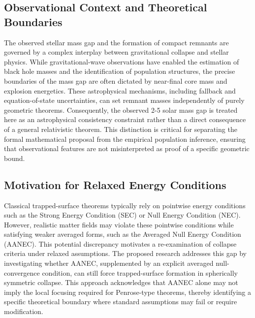 \documentclass[conference]{IEEEtran}
\begin{document}
\subsection{Observational Context and Theoretical Boundaries}
The observed stellar mass gap and the formation of compact remnants are governed by a complex interplay between gravitational collapse and stellar physics. While gravitational-wave observations have enabled the estimation of black hole masses and the identification of population structures, the precise boundaries of the mass gap are often dictated by near-final core mass and explosion energetics. These astrophysical mechanisms, including fallback and equation-of-state uncertainties, can set remnant masses independently of purely geometric theorems. Consequently, the observed 2-5 solar mass gap is treated here as an astrophysical consistency constraint rather than a direct consequence of a general relativistic theorem. This distinction is critical for separating the formal mathematical proposal from the empirical population inference, ensuring that observational features are not misinterpreted as proof of a specific geometric bound.~\cite{cite_d3016ce6d1faa8ec,cite_7a407c865faafd11}

\subsection{Motivation for Relaxed Energy Conditions}
Classical trapped-surface theorems typically rely on pointwise energy conditions such as the Strong Energy Condition (SEC) or Null Energy Condition (NEC). However, realistic matter fields may violate these pointwise conditions while satisfying weaker averaged forms, such as the Averaged Null Energy Condition (AANEC). This potential discrepancy motivates a re-examination of collapse criteria under relaxed assumptions. The proposed research addresses this gap by investigating whether AANEC, supplemented by an explicit averaged null-convergence condition, can still force trapped-surface formation in spherically symmetric collapse. This approach acknowledges that AANEC alone may not imply the local focusing required for Penrose-type theorems, thereby identifying a specific theoretical boundary where standard assumptions may fail or require modification.~\cite{cite_7a44e6730c44cb39}
\end{document}
